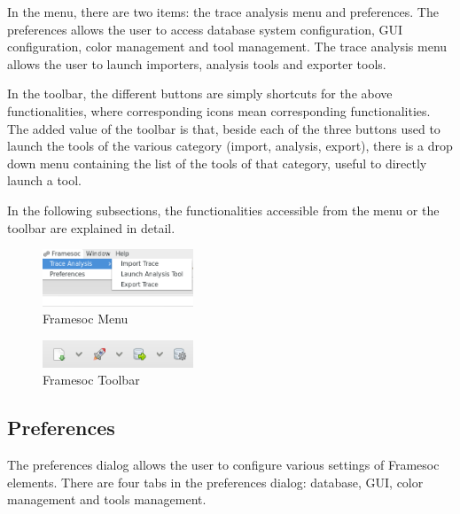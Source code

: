 \documentclass[twoside]{article}
\begin{document}
\begin{sloppypar}
In the menu, there are two items: the trace analysis menu and preferences.
The preferences allows the user to access database system configuration, GUI configuration, color management and tool management.
The trace analysis menu allows the user to launch importers, analysis tools and exporter tools.

In the toolbar, the different buttons are simply shortcuts for the above functionalities, where corresponding icons mean corresponding functionalities.
The added value of the toolbar is that, beside each of the three buttons used to launch the tools of the various category (import, analysis, export), there is a drop down menu containing the list of the tools of that category, useful to directly launch a tool.

In the following subsections, the functionalities accessible from the menu or the toolbar are explained in detail.

\begin{figure}[h!]
  \centering

    \includegraphics[width=0.4\textwidth]{images/menu.png}
  \caption{Framesoc Menu}
  \label{fig:menu}
\end{figure}

\begin{figure}[h!]
  \centering
    \includegraphics[width=0.4\textwidth]{images/toolbar.png}
  \caption{Framesoc Toolbar}
  \label{fig:toolbar}
\end{figure}

\subsection{Preferences}
\label{subsec:pref}
The preferences dialog allows the user to configure various settings of Framesoc elements. There are four tabs in the preferences dialog: database, GUI, color management and tools management.


\end{sloppypar}
\end{document}
